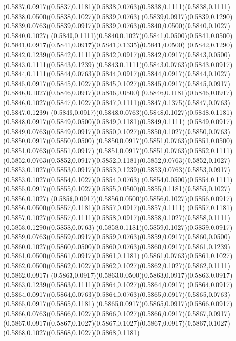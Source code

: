 (0.5837,0.0917)(0.5837,0.1181)(0.5838,0.0763)(0.5838,0.1111)(0.5838,0.1111)(0.5838,0.0500)(0.5838,0.1027)(0.5839,0.0763)
(0.5839,0.0917)(0.5839,0.1290)(0.5839,0.0763)(0.5839,0.0917)(0.5839,0.0763)(0.5840,0.0500)(0.5840,0.1027)(0.5840,0.1027)
(0.5840,0.1111)(0.5840,0.1027)(0.5841,0.0500)(0.5841,0.0500)(0.5841,0.0917)(0.5841,0.0917)(0.5841,0.1335)(0.5841,0.0500)
(0.5842,0.1290)(0.5842,0.1239)(0.5842,0.1111)(0.5842,0.0917)(0.5842,0.0917)(0.5843,0.0500)(0.5843,0.1111)(0.5843,0.1239)
(0.5843,0.1111)(0.5843,0.0763)(0.5843,0.0917)(0.5844,0.1111)(0.5844,0.0763)(0.5844,0.0917)(0.5844,0.0917)(0.5844,0.1027)
(0.5845,0.0917)(0.5845,0.1027)(0.5845,0.1027)(0.5845,0.0917)(0.5845,0.0917)(0.5846,0.1027)(0.5846,0.0917)(0.5846,0.0500)
(0.5846,0.1181)(0.5846,0.0917)(0.5846,0.1027)(0.5847,0.1027)(0.5847,0.1111)(0.5847,0.1375)(0.5847,0.0763)(0.5847,0.1239)
(0.5848,0.0917)(0.5848,0.0763)(0.5848,0.1027)(0.5848,0.1181)(0.5848,0.0917)(0.5849,0.0500)(0.5849,0.1181)(0.5849,0.1111)
(0.5849,0.0917)(0.5849,0.0763)(0.5849,0.0917)(0.5850,0.1027)(0.5850,0.1027)(0.5850,0.0763)(0.5850,0.0917)(0.5850,0.0500)
(0.5850,0.0917)(0.5851,0.0763)(0.5851,0.0500)(0.5851,0.0763)(0.5851,0.0917)
\PST@Solid(0.5851,0.0917)(0.5851,0.0763)(0.5852,0.1111)(0.5852,0.0763)(0.5852,0.0917)(0.5852,0.1181)(0.5852,0.0763)(0.5852,0.1027)
(0.5853,0.1027)(0.5853,0.0917)(0.5853,0.1239)(0.5853,0.0763)(0.5853,0.0917)(0.5853,0.1027)(0.5854,0.1027)(0.5854,0.0763)
(0.5854,0.0500)(0.5854,0.1111)(0.5855,0.0917)(0.5855,0.1027)(0.5855,0.0500)(0.5855,0.1181)(0.5855,0.1027)(0.5856,0.1027)
(0.5856,0.0917)(0.5856,0.0500)(0.5856,0.1027)(0.5856,0.0917)(0.5856,0.0500)(0.5857,0.1181)(0.5857,0.0917)(0.5857,0.1111)
(0.5857,0.1181)(0.5857,0.1027)(0.5857,0.1111)(0.5858,0.0917)(0.5858,0.1027)(0.5858,0.1111)(0.5858,0.1290)(0.5858,0.0763)
(0.5858,0.1181)(0.5859,0.1027)(0.5859,0.0917)(0.5859,0.0763)(0.5859,0.0917)(0.5859,0.0763)(0.5859,0.0917)(0.5860,0.0500)
(0.5860,0.1027)(0.5860,0.0500)(0.5860,0.0763)(0.5860,0.0917)(0.5861,0.1239)(0.5861,0.0500)(0.5861,0.0917)(0.5861,0.1181)
(0.5861,0.0763)(0.5861,0.1027)(0.5862,0.0500)(0.5862,0.1027)(0.5862,0.1027)(0.5862,0.1027)(0.5862,0.1111)(0.5862,0.0917)
(0.5863,0.0917)(0.5863,0.0500)(0.5863,0.0917)(0.5863,0.0917)(0.5863,0.1239)(0.5863,0.1111)(0.5864,0.1027)(0.5864,0.0917)
(0.5864,0.0917)(0.5864,0.0917)(0.5864,0.0763)(0.5864,0.0763)(0.5865,0.0917)(0.5865,0.0763)(0.5865,0.0917)(0.5865,0.1181)
(0.5865,0.0917)(0.5865,0.0917)(0.5866,0.0917)(0.5866,0.0763)(0.5866,0.1027)(0.5866,0.1027)(0.5866,0.0917)(0.5867,0.0917)
(0.5867,0.0917)(0.5867,0.1027)(0.5867,0.1027)(0.5867,0.0917)(0.5867,0.1027)(0.5868,0.1027)(0.5868,0.1027)(0.5868,0.1181)

